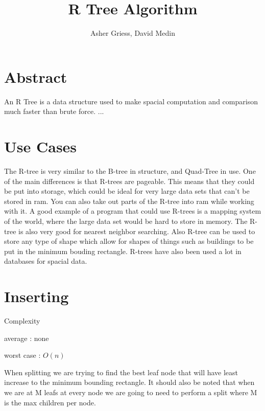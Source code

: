 \documentclass{article}
\author{Asher Griess, David Medin}
\title{R Tree Algorithm}
\begin{document}
\maketitle

\section{Abstract}
An R Tree is a data structure used to make spacial computation and comparison much faster than brute force.  ...

\section{Use Cases}
The R-tree is very similar to the B-tree in structure, and Quad-Tree in use. One of the main differences is that
R-trees are pageable. This means that they could be put into storage, which could be ideal for very large data sets
that can't be stored in ram. You can also take out parts of the R-tree into ram while working with it. A good example
of a program that could use R-trees is a mapping system of the world, where the large data set would be hard to store in memory.
The R-tree is also very good for nearest neighbor searching. Also R-tree can be used to store any type of shape which allow for shapes
of things such as buildings to be put in the minimum bouding rectangle. R-trees have also been used a lot in databases for spacial data.


\section{Inserting}
Complexity

average : none

worst case : $O(n)$

When splitting we are trying to find the best leaf node
that will have least increase to the minimum bounding rectangle.
It should also be noted that when we are at M leafs at every node we are going
to need to perform a split where M is the max children per node.
\end{document}
